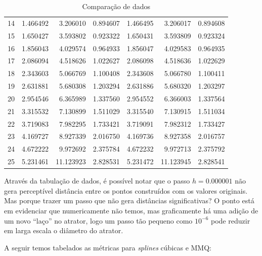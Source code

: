 \documentclass[12pt, a4paper]{article}
\begin{document}
\begin{table}[h!]
\begin{tabular}{|l|r|r|r|r|r|r|}
        14 & 1.466492 & 3.206010  & 0.894607 & 1.466495     & 3.206017     &
        0.894608
        \\
        15 & 1.650427 & 3.593802  & 0.923322 & 1.650431     & 3.593809     &
        0.923324
        \\
        16 & 1.856043 & 4.029574  & 0.964933 & 1.856047     & 4.029583     &
        0.964935
        \\
        17 & 2.086094 & 4.518626  & 1.022627 & 2.086098     & 4.518636     &
        1.022629
        \\
        18 & 2.343603 & 5.066769  & 1.100408 & 2.343608     & 5.066780     &
        1.100411
        \\
        19 & 2.631881 & 5.680308  & 1.203294 & 2.631886     & 5.680320     &
        1.203297
        \\
        20 & 2.954546 & 6.365989  & 1.337560 & 2.954552     & 6.366003     &
        1.337564
        \\
        21 & 3.315532 & 7.130899  & 1.511029 & 3.315540     & 7.130915     &
        1.511034
        \\
        22 & 3.719083 & 7.982295  & 1.733421 & 3.719091     & 7.982312     &
        1.733427
        \\
        23 & 4.169727 & 8.927339  & 2.016750 & 4.169736     & 8.927358     &
        2.016757
        \\
        24 & 4.672222 & 9.972692  & 2.375784 & 4.672232     & 9.972713     &
        2.375792
        \\
        25 & 5.231461 & 11.123923 & 2.828531 & 5.231472     & 11.123945    &
        2.828541
        \\
        \hline
    \end{tabular}
    \caption{Comparação de dados}
    \label{tab:comparacao-original-var}
\end{table}

Através da tabulação de dados, é possível notar que o passo $h = 0.000001$
não gera perceptível distância entre os pontos construídos com os valores
originais.  Mas porque trazer um passo que não gera distâncias significativas?
O ponto está em evidenciar que numericamente não temos, mas graficamente há uma
adição de um novo ``laço'' no atrator, logo um passo tão pequeno como $10^{-6}$
pode reduzir em larga escala o diâmetro do atrator.

A seguir temos tabelados as métricas para \textit{splines} cúbicas e MMQ:
\end{document}
